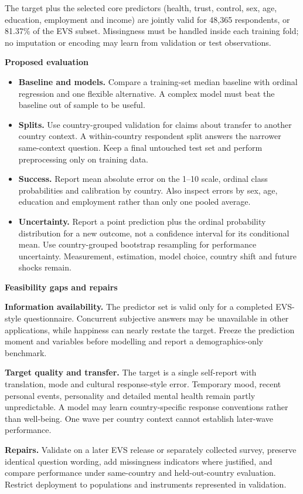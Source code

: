 \documentclass[10pt,a4paper]{article}
\newcommand{\Subsection}[1]{%
  \vspace{2pt}%
  {\fontsize{9.3}{10.3}\selectfont\bfseries\color{Navy}#1}\par
}
\newenvironment{CompactItemize}{%
  \begin{itemize}%
  \setlength{\itemsep}{1.5pt}%
  \setlength{\topsep}{2pt}%
  \setlength{\parsep}{0pt}%
  \setlength{\parskip}{0pt}%
}{\end{itemize}}
\begin{document}
The target plus the selected core predictors (health, trust, control, sex, age, education, employment and income) are jointly valid for 48,365 respondents, or 81.37\% of the EVS subset. Missingness must be handled inside each training fold; no imputation or encoding may learn from validation or test observations.

\Subsection{Proposed evaluation}
\begin{CompactItemize}
  \item \textbf{Baseline and models.} Compare a training-set median baseline with ordinal regression and one flexible alternative. A complex model must beat the baseline out of sample to be useful.
  \item \textbf{Splits.} Use country-grouped validation for claims about transfer to another country context. A within-country respondent split answers the narrower same-context question. Keep a final untouched test set and perform preprocessing only on training data.
  \item \textbf{Success.} Report mean absolute error on the 1--10 scale, ordinal class probabilities and calibration by country. Also inspect errors by sex, age, education and employment rather than only one pooled average.
  \item \textbf{Uncertainty.} Report a point prediction plus the ordinal probability distribution for a new outcome, not a confidence interval for its conditional mean. Use country-grouped bootstrap resampling for performance uncertainty. Measurement, estimation, model choice, country shift and future shocks remain.
\end{CompactItemize}

\Subsection{Feasibility gaps and repairs}
\textbf{Information availability.} The predictor set is valid only for a completed EVS-style questionnaire. Concurrent subjective answers may be unavailable in other applications, while happiness can nearly restate the target. Freeze the prediction moment and variables before modelling and report a demographics-only benchmark.

\textbf{Target quality and transfer.} The target is a single self-report with translation, mode and cultural response-style error. Temporary mood, recent personal events, personality and detailed mental health remain partly unpredictable. A model may learn country-specific response conventions rather than well-being. One wave per country context cannot establish later-wave performance.

\textbf{Repairs.} Validate on a later EVS release or separately collected survey, preserve identical question wording, add missingness indicators where justified, and compare performance under same-country and held-out-country evaluation. Restrict deployment to populations and instruments represented in validation.
\end{document}

